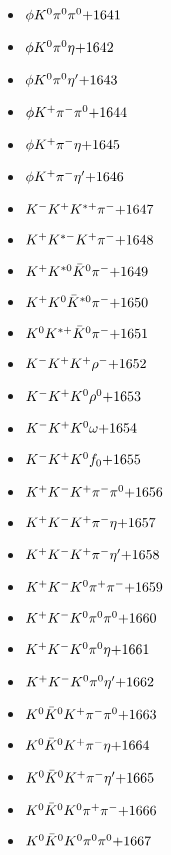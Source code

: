 \begin{multicols}{3}
\begin{itemize}
 \item $ \phi K^{0} \pi^{0} \pi^{0} \hfill{+1641}$
 \item $ \phi K^{0} \pi^{0} \eta \hfill{+1642}$
 \item $ \phi K^{0} \pi^{0} {\eta^{\prime}} \hfill{+1643}$
 \item $ \phi K^{+} \pi^{-} \pi^{0} \hfill{+1644}$
 \item $ \phi K^{+} \pi^{-} \eta \hfill{+1645}$
 \item $ \phi K^{+} \pi^{-} {\eta^{\prime}} \hfill{+1646}$
 \item $ K^{-} K^{+} K^{*+} \pi^{-} \hfill{+1647}$
 \item $ K^{+} K^{*-} K^{+} \pi^{-} \hfill{+1648}$
 \item $ K^{+} K^{*0} \bar{K}^{0} \pi^{-} \hfill{+1649}$
 \item $ K^{+} K^{0} \bar{K}^{*0} \pi^{-} \hfill{+1650}$
 \item $ K^{0} K^{*+} \bar{K}^{0} \pi^{-} \hfill{+1651}$
 \item $ K^{-} K^{+} K^{+} \rho^{-} \hfill{+1652}$
 \item $ K^{-} K^{+} K^{0} \rho^{0} \hfill{+1653}$
 \item $ K^{-} K^{+} K^{0} \omega \hfill{+1654}$
 \item $ K^{-} K^{+} K^{0} f_{0} \hfill{+1655}$
 \item $ K^{+} K^{-} K^{+} \pi^{-} \pi^{0} \hfill{+1656}$
 \item $ K^{+} K^{-} K^{+} \pi^{-} \eta \hfill{+1657}$
 \item $ K^{+} K^{-} K^{+} \pi^{-} {\eta^{\prime}} \hfill{+1658}$
 \item $ K^{+} K^{-} K^{0} \pi^{+} \pi^{-} \hfill{+1659}$
 \item $ K^{+} K^{-} K^{0} \pi^{0} \pi^{0} \hfill{+1660}$
 \item $ K^{+} K^{-} K^{0} \pi^{0} \eta \hfill{+1661}$
 \item $ K^{+} K^{-} K^{0} \pi^{0} {\eta^{\prime}} \hfill{+1662}$
 \item $ K^{0} \bar{K}^{0} K^{+} \pi^{-} \pi^{0} \hfill{+1663}$
 \item $ K^{0} \bar{K}^{0} K^{+} \pi^{-} \eta \hfill{+1664}$
 \item $ K^{0} \bar{K}^{0} K^{+} \pi^{-} {\eta^{\prime}} \hfill{+1665}$
 \item $ K^{0} \bar{K}^{0} K^{0} \pi^{+} \pi^{-} \hfill{+1666}$
 \item $ K^{0} \bar{K}^{0} K^{0} \pi^{0} \pi^{0} \hfill{+1667}$

\end{itemize}
\end{multicols}
